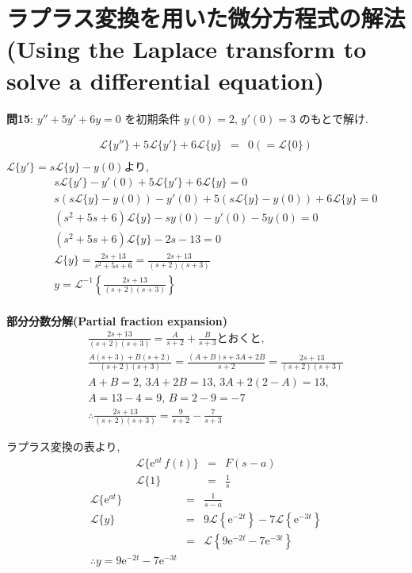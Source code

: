 ﻿\documentclass[a4j]{jarticle}
\begin{document}
\section{ラプラス変換を用いた微分方程式の解法(Using the Laplace transform to solve a differential equation)}

\noindent
{\large {\bf 問15}}: \(y''+5y'+6y=0 \) を初期条件 \( y(0)=2 ,\, y'(0)=3 \) のもとで解け.

\begin{eqnarray*}
\mathcal{L} \{ y'' \} + 5 \mathcal{L} \{ y' \} + 6\mathcal{L} \{ y \} &=& 0 ( = \mathcal{L} \{ 0 \} ) \\
\end{eqnarray*}
%
\( \mathcal{L} \{ y' \} = s \mathcal{L} \{ y \} - y(0) \)より,
%
\begin{eqnarray*}
&\,& s\mathcal{L} \{ y' \} -y'(0) + 5 \mathcal{L} \{ y' \} + 6\mathcal{L} \{ y \} = 0 \\
&\,& s(s\mathcal{L} \{ y \} - y(0)) -y'(0) + 5 (s\mathcal{L} \{ y \}-y(0)) + 6\mathcal{L} \{ y \} = 0 \\
&\,& (s^2+5s+6)\mathcal{L} \{ y \} - sy(0) -y'(0) -5y(0) = 0 \\
&\,& (s^2+5s+6)\mathcal{L} \{ y \} - 2s - 13 = 0 \\
&\,& \mathcal{L} \{ y \} = \frac{2s + 13}{s^2+5s+6} = \frac{2s+13}{(s+2)(s+3)} \\
&\,& y=\mathcal{L}^{-1} \left\{ \frac{2s+13}{(s+2)(s+3)} \right\} \\
\end{eqnarray*}
%
\begin{itembox}[l]{{\large {\bf 部分分数分解(Partial fraction expansion)}}}
\begin{eqnarray*}
&\,& \frac{2s+13}{(s+2)(s+3)} = \frac{A}{s+2}+\frac{B}{s+3}\text{とおくと,} \\
&\,& \frac{A(s+3)+B(s+2)}{(s+2)(s+3)} = \frac{(A+B)s+3A+2B}{s+2} = \frac{2s+13}{(s+2)(s+3)} \\
&\,& A+B=2 ,\, 3A+2B=13 ,\, 3A+2(2-A)=13 ,\, \\
&\,& A=13-4=9 ,\, B=2-9=-7 \\
&\,& \therefore \frac{2s+13}{(s+2)(s+3)} = \frac{9}{s+2} - \frac{7}{s+3}
\end{eqnarray*}
\end{itembox}
%
ラプラス変換の表より,
\begin{eqnarray*}
\mathcal{L} \{ \mathrm{e}^{at}\,f(t) \} &=& F(s-a) \\
                    \mathcal{L} \{ 1 \} &=& \frac{1}{s}
\end{eqnarray*}
%
\begin{eqnarray*}
\mathcal{L} \{ \mathrm{e}^{at} \} &=& \frac{1}{s-a} \\
\mathcal{L} \{ y \} &=& 9 \mathcal{L} \left\{ \mathrm{e}^{-2t} \right\} -7 \mathcal{L} \left\{ \mathrm{e}^{-3t} \right\} \\
                    &=& \mathcal{L} \left\{ 9\mathrm{e}^{-2t} - 7 \mathrm{e}^{-3t} \right\} \\
\therefore y = 9\mathrm{e}^{-2t} - 7 \mathrm{e}^{-3t}
\end{eqnarray*}
\end{document}
